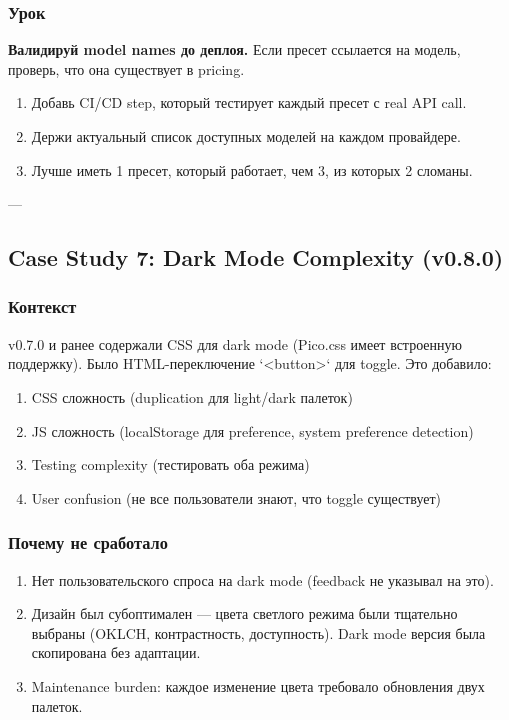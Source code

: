 \subsubsection*{Урок}
\textbf{Валидируй model names до деплоя.} Если пресет ссылается на модель, проверь, что она существует в pricing.

\begin{enumerate}
\item Добавь CI/CD step, который тестирует каждый пресет с real API call.
\item Держи актуальный список доступных моделей на каждом провайдере.
\item Лучше иметь 1 пресет, который работает, чем 3, из которых 2 сломаны.
\end{enumerate}

---

\subsection{Case Study 7: Dark Mode Complexity (v0.8.0)}

\subsubsection*{Контекст}
v0.7.0 и ранее содержали CSS для dark mode (Pico.css имеет встроенную поддержку). Было HTML-переключение `<button>` для toggle. Это добавило:
\begin{enumerate}
\item CSS сложность (duplication для light/dark палеток)
\item JS сложность (localStorage для preference, system preference detection)
\item Testing complexity (тестировать оба режима)
\item User confusion (не все пользователи знают, что toggle существует)
\end{enumerate}

\subsubsection*{Почему не сработало}
\begin{enumerate}
\item Нет пользовательского спроса на dark mode (feedback не указывал на это).
\item Дизайн был субоптимален --- цвета светлого режима были тщательно выбраны (OKLCH, контрастность, доступность). Dark mode версия была скопирована без адаптации.
\item Maintenance burden: каждое изменение цвета требовало обновления двух палеток.
\end{enumerate}

